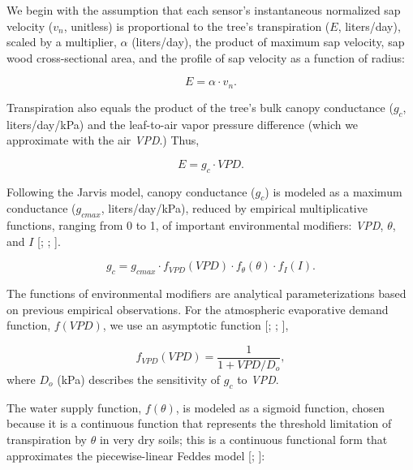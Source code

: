 We begin with the assumption that each sensor's instantaneous normalized sap velocity ($v_n$, unitless) is proportional to the tree's transpiration ($E$, liters/day), scaled by a multiplier, $\alpha$ (liters/day), the product of maximum sap velocity, sap wood cross-sectional area, and the profile of sap velocity as a function of radius:

\begin{equation} %
\label{eqn:sf1}
E = \alpha \cdot v_n.
\end{equation}

Transpiration also equals the product of the tree's bulk canopy conductance ($g_c$, liters/day/kPa) and the leaf-to-air vapor pressure difference (which we approximate with the air \textit{VPD}.)  Thus,

\begin{equation} %
E = g_c \cdot VPD.
\end{equation}

Following the Jarvis model, canopy conductance ($g_c$) is modeled as a maximum conductance ($g_{cmax}$, liters/day/kPa), reduced by empirical multiplicative functions, ranging from 0 to 1, of important environmental modifiers: \textit{VPD}, $\theta$, and $I$ [\cite{jarvis1976interpretation}; \cite{oren1999survey}; \cite{waring2011generalizing}].

\begin{equation}  %
g_c = g_{cmax} \cdot f_{VPD}(VPD) \cdot f_{\theta}(\theta) \cdot f_I(I).
\end{equation}

The functions of environmental modifiers are analytical parameterizations based on previous empirical observations.  For the atmospheric evaporative demand function, $f(VPD)$, we use an asymptotic function [\cite{lohammar1980fast}; \cite{lindroth1986numerical}; \cite{dang1997regulation}],

\begin{equation}  %
f_{VPD}(VPD) = \frac{1}{1+VPD/D_o},
\end{equation}
where $D_o$ (kPa) describes the sensitivity of $g_c$ to \textit{VPD}.

The water supply function, $f(\theta)$, is modeled as a sigmoid function, chosen because it is a continuous function that represents the threshold limitation of transpiration by $\theta$ in very dry soils; this is a continuous functional form that approximates the piecewise-linear Feddes model [\cite{feddes}; \cite{chen2008observations}]:

